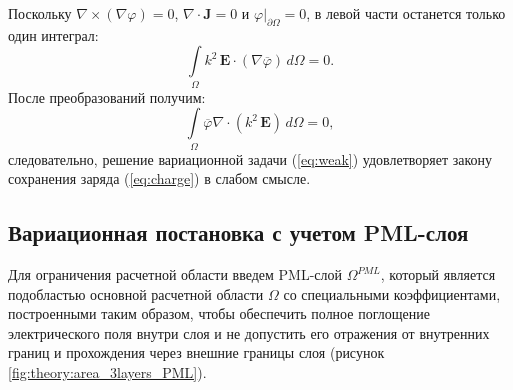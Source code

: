 \documentclass[a4paper,14pt]{article}
\begin{document}
Поскольку $\nabla \times (\nabla \varphi) = 0$, $\nabla \cdot \mathbf{J} = 0$ и $\left. \varphi \right | _{\partial \Omega} = 0$, в левой части останется только один интеграл:
\begin{equation*}
	\int\limits_\Omega k^{2}\, \mathbf{E} \cdot (\nabla \overline{\varphi}) \,d\Omega = 0 .
\end{equation*}
После преобразований получим:
\begin{equation*}
	\int\limits_\Omega \overline{\varphi} \nabla \cdot ( k^{2}\, \mathbf{E} ) \,d\Omega = 0 ,
\end{equation*}
следовательно, решение вариационной задачи (\ref{eq:weak}) удовлетворяет закону сохранения заряда (\ref{eq:charge}) в слабом смысле.


\subsection{Вариационная постановка с учетом PML-слоя}
Для ограничения расчетной области введем PML-слой ${\Omega^{PML}}$, который является подобластью основной расчетной области $\Omega$ со специальными коэффициентами, построенными таким образом, чтобы обеспечить полное поглощение электрического поля внутри слоя и не допустить его отражения от внутренних границ и прохождения через внешние границы слоя (рисунок \ref{fig:theory:area_3layers_PML}).
\end{document}
